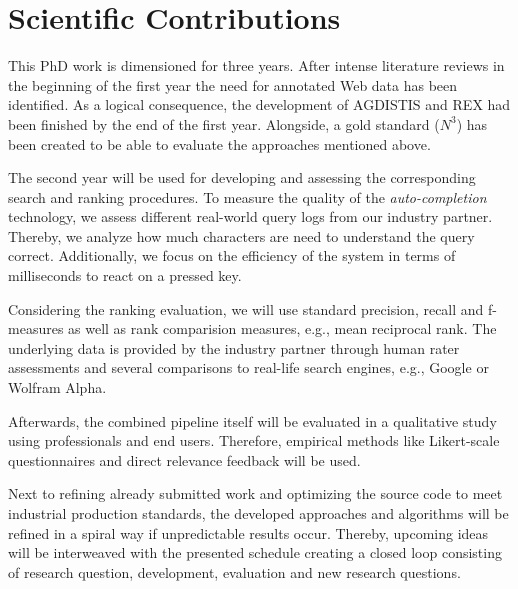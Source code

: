 \section{Scientific Contributions}
This PhD work is dimensioned for three years. 
After intense literature reviews in the beginning of the first year the need for annotated Web data has been identified.
As a logical consequence, the development of AGDISTIS and REX had been finished by the end of the first year. 
Alongside, a gold standard ($N^3$) has been created to be able to evaluate the approaches mentioned above.

The second year will be used for developing and assessing the corresponding search and ranking procedures. 
To measure the quality of the \emph{auto-completion} technology, we assess different real-world query logs from our industry partner.
Thereby, we analyze how much characters are need to understand the query correct.
Additionally, we focus on the efficiency of the system in terms of milliseconds to react on a pressed key.

Considering the ranking evaluation, we will use standard precision, recall and f-measures as well as rank comparision measures, e.g., mean reciprocal rank. 
The underlying data is provided by the industry partner through human rater assessments and several comparisons to real-life search engines, e.g., Google or Wolfram Alpha.

Afterwards, the combined pipeline itself will be evaluated in a qualitative study using professionals and end users.
Therefore, empirical methods like Likert-scale questionnaires and direct relevance feedback will be used.


Next to refining already submitted work and optimizing the source code to meet industrial production standards, the developed approaches and algorithms will be refined in a spiral way if unpredictable results occur.
Thereby, upcoming ideas will be interweaved with the presented schedule creating a closed loop consisting of research question, development, evaluation and new research questions.